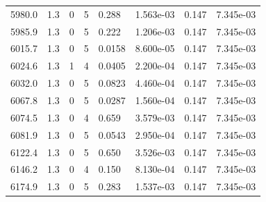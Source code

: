 \documentclass[preview]{standalone}
\begin{document}
{{{{{{{{{{{{\begin{tabular}{L{1.2cm}C{1.2cm} C{0.3cm}C{0.5cm} C{1.4cm}C{1.4cm} C{1.4cm}C{1.4cm}}
  5980.0  &   1.3  & 0     &  5 &  0.288  & 1.563e-03  & 0.147 &  7.345e-03   \\ 
  5985.9  &   1.3  & 0     &  5 &  0.222  & 1.206e-03  & 0.147 &  7.345e-03   \\ 
  6015.7  &   1.3  & 0     &  5 &  0.0158  & 8.600e-05  & 0.147 &  7.345e-03   \\ 
  6024.6  &   1.3  & 1     &  4 &  0.0405  & 2.200e-04  & 0.147 &  7.345e-03   \\ 
  6032.0  &   1.3  & 0     &  5 &  0.0823  & 4.460e-04  & 0.147 &  7.345e-03   \\ 
  6067.8  &   1.3  & 0     &  5 &  0.0287  & 1.560e-04  & 0.147 &  7.345e-03   \\ 
  6074.5  &   1.3  & 0     &  4 &  0.659  & 3.579e-03  & 0.147 &  7.345e-03   \\ 
  6081.9  &   1.3  & 0     &  5 &  0.0543  & 2.950e-04  & 0.147 &  7.345e-03   \\ 
  6122.4  &   1.3  & 0     &  5 &  0.650  & 3.526e-03  & 0.147 &  7.345e-03   \\ 
  6146.2  &   1.3  & 0     &  4 &  0.150  & 8.130e-04  & 0.147 &  7.345e-03   \\ 
  6174.9  &   1.3  & 0     &  5 &  0.283  & 1.537e-03  & 0.147 &  7.345e-03   \\ 
\hline 
\end{tabular} 

}}}}}}}}}}}}
\end{document}
